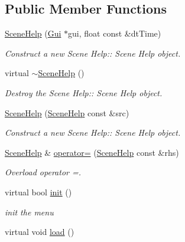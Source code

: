 \subsection*{Public Member Functions}
\begin{DoxyCompactItemize}
\item 
\hyperlink{class_scene_help_aaae713d2e50fed0d067b5647697a8967}{Scene\+Help} (\hyperlink{class_gui}{Gui} $\ast$gui, float const \&dt\+Time)
\begin{DoxyCompactList}\small\item\em Construct a new Scene Help\+:\+: Scene Help object. \end{DoxyCompactList}\item 
\mbox{\label{class_scene_help_a0fc4785d25509d5d81ddb7b1e04a8ea8}} 
virtual \hyperlink{class_scene_help_a0fc4785d25509d5d81ddb7b1e04a8ea8}{$\sim$\+Scene\+Help} ()
\begin{DoxyCompactList}\small\item\em Destroy the Scene Help\+:\+: Scene Help object. \end{DoxyCompactList}\item 
\hyperlink{class_scene_help_a5ace5269e4c0405184568ff206a456b6}{Scene\+Help} (\hyperlink{class_scene_help}{Scene\+Help} const \&src)
\begin{DoxyCompactList}\small\item\em Construct a new Scene Help\+:\+: Scene Help object. \end{DoxyCompactList}\item 
\hyperlink{class_scene_help}{Scene\+Help} \& \hyperlink{class_scene_help_a760a6a537ff90f4e403b06536a837286}{operator=} (\hyperlink{class_scene_help}{Scene\+Help} const \&rhs)
\begin{DoxyCompactList}\small\item\em Overload operator =. \end{DoxyCompactList}\item 
virtual bool \hyperlink{class_scene_help_adabf402b245092d311b08ec1139aa3c5}{init} ()
\begin{DoxyCompactList}\small\item\em init the menu \end{DoxyCompactList}\item 
\mbox{\label{class_scene_help_abba5fe9f2d582141e4b2b39c23a8c696}} 
virtual void \hyperlink{class_scene_help_abba5fe9f2d582141e4b2b39c23a8c696}{load} ()

\end{DoxyCompactItemize}
